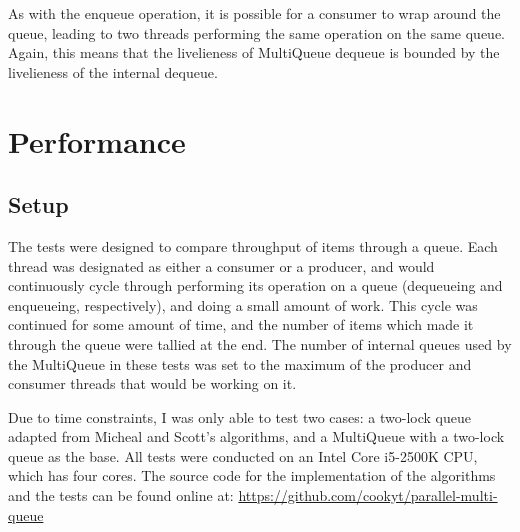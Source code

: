 \documentclass[12pt]{report}
\begin{document}
As with the enqueue operation, it is possible for a consumer to wrap around the
queue, leading to two threads performing the same operation on the same queue.
Again, this means that the livelieness of MultiQueue dequeue is bounded by the
livelieness of the internal dequeue.



\section{Performance}
\subsection{Setup}
The tests were designed to compare throughput of items through a queue. Each
thread was designated as either a consumer or a producer, and would
continuously cycle through performing its operation on a queue (dequeueing and
enqueueing, respectively), and doing a small amount of work. This cycle was
continued for some amount of time, and the number of items which made it
through the queue were tallied at the end. The number of internal queues used
by the MultiQueue in these tests was set to the maximum of the producer and
consumer threads that would be working on it.

Due to time constraints, I was only able to test two cases: a two-lock queue
adapted from Micheal and Scott's algorithms\cite{michael1996}, and a MultiQueue
with a two-lock queue as the base. All tests were conducted on an Intel Core
i5-2500K CPU, which has four cores. The source code for the implementation of
the algorithms and the tests can be found online at:
\url{https://github.com/cookyt/parallel-multi-queue}
\end{document}
